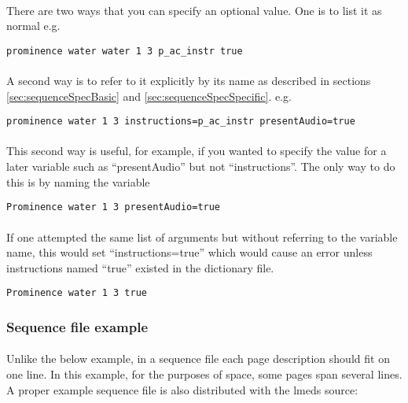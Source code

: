 \paragraph{}
There are two ways that you can specify an optional value.  One is to list it as normal e.g.

\begin{lstlisting}
prominence water water 1 3 p_ac_instr true
\end{lstlisting}

\paragraph{}
A second way is to refer to it explicitly by its name as described in sections \ref{sec:sequenceSpecBasic} and \ref{sec:sequenceSpecSpecific}. e.g.

\begin{lstlisting}
prominence water 1 3 instructions=p_ac_instr presentAudio=true
\end{lstlisting}

\paragraph{}
This second way is useful, for example, if you wanted to specify the value for a later variable such as ``presentAudio'' but not ``instructions''.  The only way to do this is by naming the variable 

\begin{lstlisting}
Prominence water 1 3 presentAudio=true
\end{lstlisting}

\paragraph{}
If one attempted the same list of arguments but without referring to the variable name, this would set ``instructions=true'' which would cause an error unless instructions named ``true'' existed in the dictionary file.

\begin{lstlisting}
Prominence water 1 3 true
\end{lstlisting}


\subsubsection{Sequence file example}
\label{sec:sequenceFileExample}

\paragraph{}
Unlike the below example, in a sequence file each page description should fit on one line.  In this example, for the purposes of space, some pages span several lines.  A proper example sequence file is also distributed with the lmeds source:

